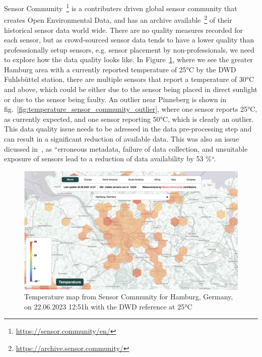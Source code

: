 Sensor Community~\footnote{\url{https://sensor.community/en/}} is a contributers driven global sensor community that creates Open Environmental Data, and has an archive available~\footnote{\url{https://archive.sensor.community/}} of their historical sensor data world wide. There are no quality measures recorded for each sensor, but as crowd-sourced sensor data tends to have a lower quality than professsionally setup sensors, e.g. sensor placement by non-professionals, we need to explore how the data quality looks like.
In Figure~\ref{fig:temperature_sensor_community_map}, where we see the greater Hamburg area with a currently reported temperature of 25°C by the DWD Fuhlsbüttel station, there are multiple sensors that report a temperature of 30°C and above, which could be either due to the sensor being placed in direct sunlight or due to the sensor being faulty. An outlier near Pinneberg is shown in fig.~\ref{fig:temperature_sensor_community_outlier}, where one sensor reports 25°C, as currently expected, and one sensor reporting 50°C, which is clearly an outlier. This data quality issue needs to be adressed in the data pre-processing step and can result in a significant reduction of available data. This was also an issue dicussed in~\cite{meier2017crowdsourcing}, as ``erroneous metadata, failure of data collection, and unsuitable exposure of sensors lead to a reduction of data availability by 53 \%``.

\begin{figure}[ht]
    \centering
    \includegraphics[width=1\textwidth]{images/sensor_community_temperature_map.png}
    \caption{Temperature map from Sensor Community for Hamburg, Germany, on 22.06.2023 12:51h with the DWD reference at 25°C}
    \label{fig:temperature_sensor_community_map}
\end{figure}

